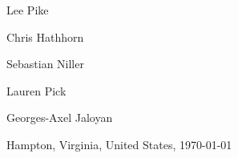 \documentclass[12pt]{article}
\theoremstyle{example}
\begin{document}
\begin{center}
\vspace{1cm}

\begin{minipage}{0.3\textwidth}
\large
\begin{center}
Lee Pike\\
\end{center}
\end{minipage}
%
\begin{minipage}{0.3\textwidth}
\large
\begin{center}
Chris Hathhorn \\
\end{center}
\end{minipage}

\vspace{1cm}

\begin{minipage}{0.3\textwidth}
\large
\begin{center}
Sebastian Niller\\
\end{center}
\end{minipage}
%
\begin{minipage}{0.3\textwidth}
\large
\begin{center}
Lauren Pick\\
\end{center}
\end{minipage}

\vspace{1cm}

\begin{minipage}{0.3\textwidth}
\large
\begin{center}
Georges-Axel Jaloyan \\
\end{center}
\end{minipage}

\vspace{1cm}

{\large
Hampton, Virginia, United States, \today
}


\let\thefootnote\relax{}

\end{center}
\end{document}
